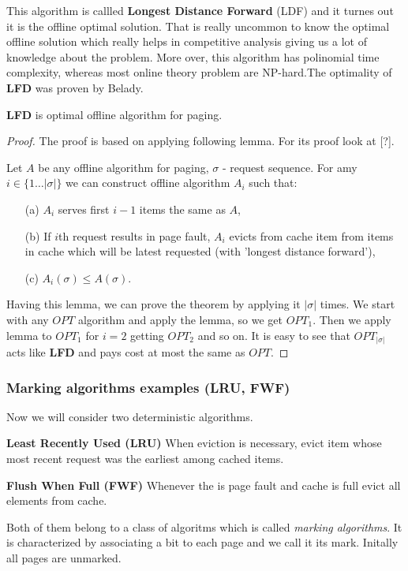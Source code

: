 This algorithm is callled \textbf{Longest Distance Forward} (LDF) and it turnes 
out it is the offline optimal solution. That is really uncommon to know the 
optimal offline solution which really helps in competitive analysis giving us 
a lot of knowledge about the problem. More over, this algorithm has polinomial 
time complexity, whereas most online theory problem are NP-hard.The optimality 
of \textbf{LFD} was proven by Belady.
\begin{theorem}
 \textbf{LFD} is optimal offline algorithm for paging.
\end{theorem}
\begin{proof}
 The proof is based on applying following lemma. For its proof look at [?].
\begin{lemma}
Let $A$ be any offline algorithm for paging, $\sigma$ - request sequence. For 
amy $i \in \{1 \ldots |\sigma|\}$ we can construct offline algorithm $A_i$ such 
that:
\begin{itemize}
 \item[(a)] $A_i$ serves first $i-1$ items the same as $A$,
 \item[(b)] If $i$th request results in page fault, $A_i$ evicts from cache 
item from items in cache which will be latest requested (with 'longest distance 
forward'),
  \item[(c)] $A_i(\sigma) \leq A(\sigma)$.
\end{itemize}
\end{lemma}
Having this lemma, we can prove the theorem by applying it $|\sigma|$ times. 
We start with any $OPT$ algorithm and apply the lemma, so we get $OPT_1$. Then 
we apply lemma to $OPT_1$ for $i=2$ getting $OPT_2$ and so on. It is easy to 
see that $OPT_{|\sigma|}$ acts like \textbf{LFD} and pays cost at most the 
same 
as $OPT$.
\end{proof}

\subsubsection{Marking algorithms examples (LRU, FWF)}
Now we will consider two deterministic algorithms.
\begin{myalgo}
 \textbf{Least Recently Used (LRU)}
 \newline
When eviction is necessary, evict item whose most recent request was the 
earliest among cached items.
\end{myalgo}
\begin{myalgo}
  \textbf{Flush When Full (FWF)}
  \newline
Whenever the is page fault and cache is full evict all elements from cache.
\end{myalgo}
Both of them belong to a class of algoritms which is called \textit{marking 
algorithms}. It is characterized by associating a bit to each page and we call 
it its mark. Initally all pages are unmarked. 

